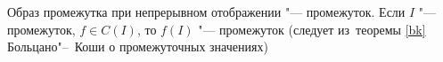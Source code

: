 
Образ промежутка при непрерывном отображении "--- промежуток. Если $I$ "--- промежуток, $f\in C(I)$, то $f(I)$ "--- промежуток (следует из~теоремы \ref{bk} Больцано"--~Коши о промежуточных значениях)
